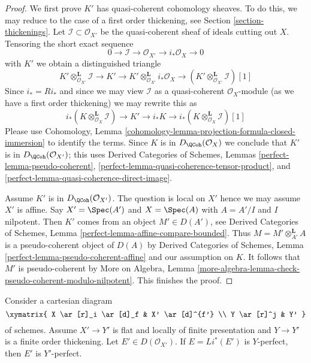 \begin{proof}
We first prove $K'$ has quasi-coherent cohomology sheaves.
To do this, we may reduce to the case of a first order thickening, see
Section \ref{section-thickenings}. Let $\mathcal{I} \subset \mathcal{O}_{X'}$
be the quasi-coherent sheaf of ideals cutting out $X$.
Tensoring the short exact sequence
$$
0 \to \mathcal{I} \to \mathcal{O}_{X'} \to i_*\mathcal{O}_X \to 0
$$
with $K'$ we obtain a distinguished triangle
$$
K' \otimes_{\mathcal{O}_{X'}}^\mathbf{L} \mathcal{I}
\to K' \to
K' \otimes_{\mathcal{O}_{X'}}^\mathbf{L} i_*\mathcal{O}_X
\to
(K' \otimes_{\mathcal{O}_{X'}}^\mathbf{L} \mathcal{I})[1]
$$
Since $i_* = Ri_*$ and since we may view $\mathcal{I}$
as a quasi-coherent $\mathcal{O}_X$-module (as we have a first
order thickening) we may rewrite this as
$$
i_*(K \otimes_{\mathcal{O}_X}^\mathbf{L} \mathcal{I})
\to K' \to
i_*K \to
i_*(K \otimes_{\mathcal{O}_X}^\mathbf{L} \mathcal{I})[1]
$$
Please use Cohomology, Lemma
\ref{cohomology-lemma-projection-formula-closed-immersion}
to identify the terms. Since $K$ is in
$D_\QCoh(\mathcal{O}_X)$ we conclude that
$K'$ is in $D_\QCoh(\mathcal{O}_{X'})$; this uses
Derived Categories of Schemes, Lemmas
\ref{perfect-lemma-pseudo-coherent},
\ref{perfect-lemma-quasi-coherence-tensor-product}, and
\ref{perfect-lemma-quasi-coherence-direct-image}.

\medskip\noindent
Assume $K'$ is in $D_\QCoh(\mathcal{O}_{X'})$.
The question is local on $X'$ hence we may assume $X'$ is affine.
Say $X' = \Spec(A')$ and $X = \Spec(A)$ with $A = A'/I$ and $I$ nilpotent.
Then $K'$ comes from an object $M' \in D(A')$, see
Derived Categories of Schemes, Lemma
\ref{perfect-lemma-affine-compare-bounded}.
Thus $M = M' \otimes_{A'}^\mathbf{L} A$ is a pseudo-coherent
object of $D(A)$ by Derived Categories of Schemes,
Lemma \ref{perfect-lemma-pseudo-coherent-affine} and our assumption on $K$.
It follows that $M'$ is pseudo-coherent by
More on Algebra, Lemma
\ref{more-algebra-lemma-check-pseudo-coherent-modulo-nilpotent}.
This finishes the proof.
\end{proof}

\begin{lemma}
\label{lemma-thickening-relatively-perfect}
Consider a cartesian diagram
$$
\xymatrix{
X \ar[r]_i \ar[d]_f & X' \ar[d]^{f'} \\
Y \ar[r]^j & Y'
}
$$
of schemes. Assume $X' \to Y'$ is flat and locally
of finite presentation and $Y \to Y'$ is a finite order thickening.
Let $E' \in D(\mathcal{O}_{X'})$. If $E = Li^*(E')$ is $Y$-perfect,
then $E'$ is $Y'$-perfect.
\end{lemma}

